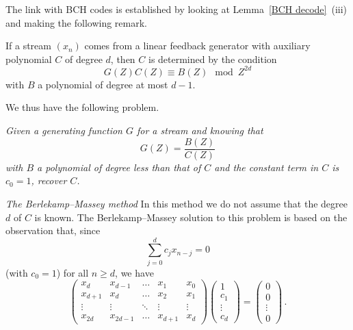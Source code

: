 The link with BCH codes is established
by looking at Lemma~\ref{BCH decode}~(iii) and
making the following remark.
\begin{lemma}\label{how long}
If a stream $(x_{n})$
comes from a linear feedback generator with
auxiliary polynomial $C$ of degree $d$,
then $C$ is determined by the condition
\[G(Z)C(Z)\equiv B(Z)\mod{Z^{2d}}\]
with $B$ a polynomial of degree at most $d-1$.
\end{lemma}

We thus have the following problem.

\emph{Given a generating function $G$
for a stream  and knowing that
\[G(Z)=\frac{B(Z)}{C(Z)}\]
with $B$ a polynomial of degree less than that
of $C$ and the constant term in $C$ is
$c_{0}=1$, recover $C$.}

\vspace{1\baselineskip}


\noindent\emph{The Berlekamp--Massey method}
In this method we do not assume that
the degree $d$ of $C$ is known.
The Berlekamp--Massey solution to this problem
is based on the observation that, since
\[\sum_{j=0}^{d}c_{j}x_{n-j}=0\]
(with $c_{0}=1$)
for all $n\geq d$, we have
\begin{equation*}
\begin{pmatrix}
x_{d}&x_{d-1}&\dots&x_{1}&x_{0}\\
x_{d+1}&x_{d}&\dots&x_{2}&x_{1}\\
\vdots&\vdots&\ddots&\vdots&\vdots\\
x_{2d}&x_{2d-1}&\dots&x_{d+1}&x_{d}
\end{pmatrix}
\begin{pmatrix}
1\\c_{1}\\ \vdots\\c_{d}
\end{pmatrix}
=\begin{pmatrix}
0\\0\\ \vdots\\0
\end{pmatrix}\,.
\tag*{$\bigstar$}
\end{equation*}

